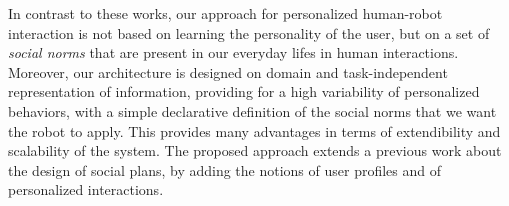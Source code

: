 In contrast to these works, our approach for personalized human-robot
interaction is not based on learning the personality of the user, but
on a set of \textit{social norms} that are present in our everyday
lifes in human interactions.  Moreover, our architecture is designed on domain and task-independent representation of information, providing for a high variability of personalized behaviors, with a simple declarative definition of the social norms that we want the robot to apply. This provides many advantages in terms of extendibility and scalability of the system.
The proposed approach extends a previous work \cite{Nardi14} about the design of social plans, by adding the notions of user profiles and of personalized interactions.


